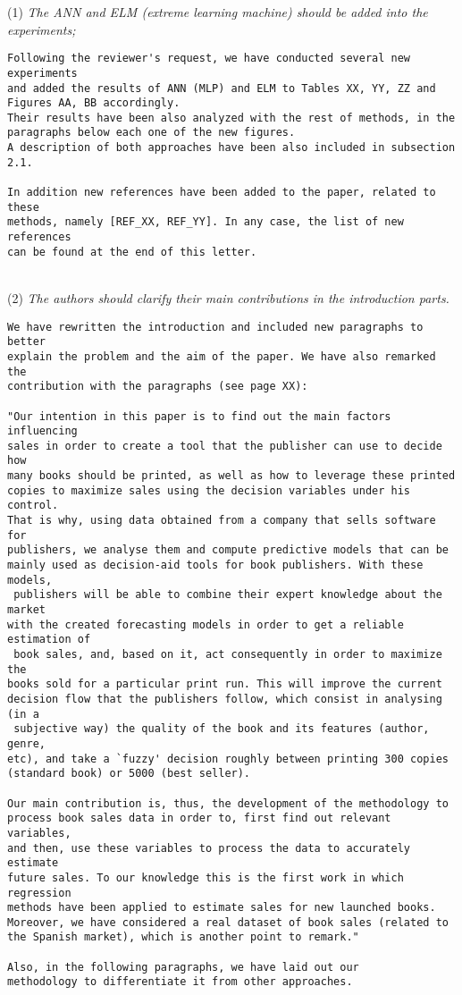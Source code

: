 \documentclass[preprint]{elsarticle}
\begin{document}
\noindent (1) \emph{The ANN and ELM (extreme learning machine) should be added into the experiments; } 

\begin{verbatim}
Following the reviewer's request, we have conducted several new experiments 
and added the results of ANN (MLP) and ELM to Tables XX, YY, ZZ and
Figures AA, BB accordingly. 
Their results have been also analyzed with the rest of methods, in the 
paragraphs below each one of the new figures.
A description of both approaches have been also included in subsection 2.1.

In addition new references have been added to the paper, related to these 
methods, namely [REF_XX, REF_YY]. In any case, the list of new references
can be found at the end of this letter.
\end{verbatim}


~\\
\noindent (2) \emph{The authors should clarify their main contributions in the introduction parts.}

\begin{verbatim}
We have rewritten the introduction and included new paragraphs to better 
explain the problem and the aim of the paper. We have also remarked the
contribution with the paragraphs (see page XX):

"Our intention in this paper is to find out the main factors influencing
sales in order to create a tool that the publisher can use to decide how
many books should be printed, as well as how to leverage these printed
copies to maximize sales using the decision variables under his control. 
That is why, using data obtained from a company that sells software for 
publishers, we analyse them and compute predictive models that can be 
mainly used as decision-aid tools for book publishers. With these models,
 publishers will be able to combine their expert knowledge about the market 
with the created forecasting models in order to get a reliable estimation of
 book sales, and, based on it, act consequently in order to maximize the 
books sold for a particular print run. This will improve the current 
decision flow that the publishers follow, which consist in analysing (in a
 subjective way) the quality of the book and its features (author, genre, 
etc), and take a `fuzzy' decision roughly between printing 300 copies 
(standard book) or 5000 (best seller).

Our main contribution is, thus, the development of the methodology to 
process book sales data in order to, first find out relevant variables, 
and then, use these variables to process the data to accurately estimate 
future sales. To our knowledge this is the first work in which regression 
methods have been applied to estimate sales for new launched books. 
Moreover, we have considered a real dataset of book sales (related to 
the Spanish market), which is another point to remark."

Also, in the following paragraphs, we have laid out our 
methodology to differentiate it from other approaches.
\end{verbatim}
\end{document}
